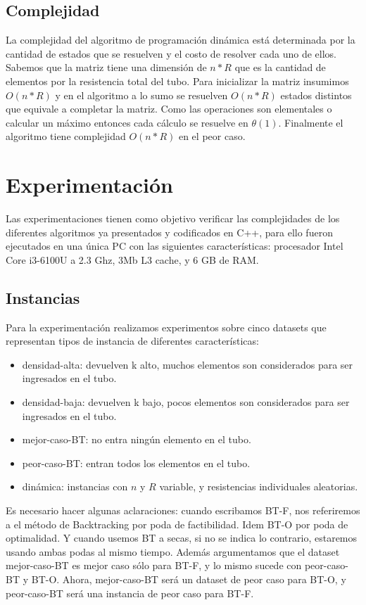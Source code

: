 \documentclass[10pt,a4paper]{article}
\begin{document}
\subsection{Complejidad}
La complejidad del algoritmo de programación dinámica está determinada por la cantidad de estados que se resuelven y el costo de resolver cada uno de ellos.
Sabemos que la matriz tiene una dimensión de $n * R$ que es la cantidad de elementos por la resistencia total del tubo. Para inicializar la matriz insumimos $O(n * R)$ y en el algoritmo a lo sumo se resuelven $O(n * R)$ estados distintos que equivale a completar la matriz. Como las operaciones son elementales o calcular un máximo entonces cada cálculo se resuelve en $\theta(1)$. Finalmente el algoritmo tiene complejidad $O(n * R)$ en el peor caso.

\section{Experimentación} \label{sec:experimentacion}
Las experimentaciones tienen como objetivo verificar las complejidades de los diferentes algoritmos ya presentados y codificados en C++, para ello fueron ejecutados en una única PC con las siguientes características: procesador Intel Core i3-6100U a 2.3 Ghz, 3Mb L3 cache, y 6 GB de RAM.

\subsection{Instancias} \label{instancias}
Para la experimentación realizamos experimentos sobre cinco datasets que representan tipos de instancia de diferentes características:
\begin{itemize}
	\item densidad-alta: devuelven k alto, muchos elementos son considerados para ser ingresados en el tubo.
	\item densidad-baja: devuelven k bajo, pocos elementos son considerados para ser ingresados en el tubo.
	\item mejor-caso-BT: no entra ningún elemento en el tubo.
	\item peor-caso-BT: entran todos los elementos en el tubo.
	\item dinámica: instancias con $n$ y $R$ variable, y resistencias individuales aleatorias.
\end{itemize}
Es necesario hacer algunas aclaraciones: cuando escribamos BT-F, nos referiremos a el método de Backtracking por poda de factibilidad. Idem BT-O por poda de optimalidad. Y cuando usemos BT a secas, si no se indica lo contrario, estaremos usando ambas podas al mismo tiempo.\newline
Además argumentamos que el dataset mejor-caso-BT es mejor caso sólo para BT-F, y lo mismo sucede con peor-caso-BT y BT-O. Ahora, mejor-caso-BT será un dataset de peor caso para BT-O, y peor-caso-BT será una instancia de peor caso para BT-F.
\end{document}
